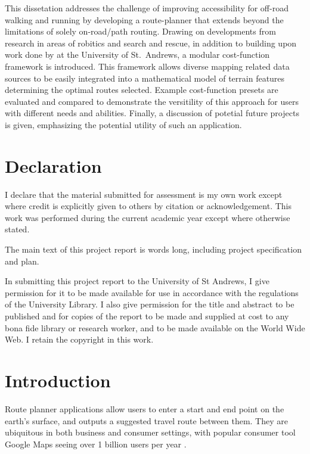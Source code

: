\documentclass[12pt]{article}
\begin{document}
This dissetation addresses the challenge of improving accessibility for off-road walking and running by developing a route-planner that extends beyond the limitations of solely on-road/path routing. Drawing on developments from research in areas of robitics and search and rescue, in addition to building upon work done by \textcite{evans2023tsr} at the University of St.\ Andrews, a modular cost-function framework is introduced. This framework allows diverse mapping related data sources to be easily integrated into a mathematical model of terrain features determining the optimal routes selected. Example cost-function presets are evaluated and compared to demonstrate the versitility of this approach for users with different needs and abilities. Finally, a discussion of potetial future projects is given, emphasizing the potential utility of such an application.

\section*{Declaration}

I declare that the material submitted for assessment is
my own work except where credit is explicitly given to
others by citation or acknowledgement. This work was
performed during the current academic year except where
otherwise stated.

The main text of this project report is
words long, including project specification and plan.

In submitting this project report to the University of St
Andrews, I give permission for it to be made available for
use in accordance with the regulations of the University
Library. I also give permission for the title and abstract to
be published and for copies of the report to be made and
supplied at cost to any bona fide library or research
worker, and to be made available on the World Wide Web.
I retain the copyright in this work.

\pagebreak
\tableofcontents

\pagebreak
\pagestyle{fancy}

\section{Introduction}

Route planner applications allow users to enter a start and end point on the earth's surface, and outputs a suggested travel route between them. They are ubiquitous in both business and consumer settings, with popular consumer tool Google Maps seeing over 1 billion users per year \autocite{google2019keyword}.
\end{document}
